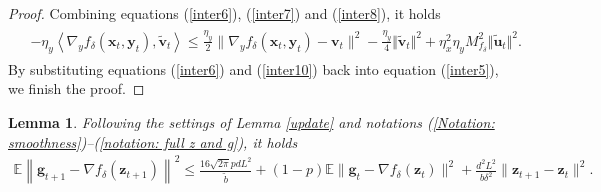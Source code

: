 \documentclass[11pt]{article}
\def\vg{\mathbf{g}}
\def\vu{\mathbf{u}}
\def\vv{\mathbf{v}}
\def\vx{\mathbf{x}}
\def\vz{\mathbf{z}}
\newtheorem{lemma}{Lemma}
\begin{document}
\begin{proof}
Combining equations (\ref{inter6}), (\ref{inter7}) and (\ref{inter8}), it holds
\begin{align}\label{inter10}
\begin{split}
&-\eta_y \left\langle \nabla_y f_{\delta}(  \vx_t, \mathbf{y}_t ),  \tilde{\vv}_t  \right\rangle\le
\frac{\eta_y}{2}\|\nabla_y f_{\delta}(  \vx_t, \mathbf{y}_t )- \mathbf{v}_t\|^2-
\frac{\eta_y}{4} \Vert \tilde{\vv}_t  \Vert^2 + \eta_x^2 \eta_y M_{f_\delta}^2 \Vert  \tilde{\vu}_t \Vert^2.
\end{split}
\end{align}
By substituting equations (\ref{inter6}) and (\ref{inter10}) back into equation (\ref{inter5}),  we finish the proof.
\end{proof} 


\begin{lemma}\label{lemma: C.4 SVRG accelerate}
Following the settings of Lemma \ref{update} and notations (\ref{Notation: smoothness})--(\ref{notation: full z and g}),  it holds
\begin{align}\label{ineq: variance reduction}
\!\!\mathbb{E} \left\| \vg_{t+1} - \nabla f_\delta(\vz_{t+1}) \right\|^2 
\leq \frac{ 16\sqrt{2\pi}pdL^2}{\tilde{b}} + (1-p) \mathbb{E} \| \vg_t - \nabla f_\delta(\vz_t) \|^2 +\frac{d^2L^2}{b\delta^2} \| \vz_{t+1}-\vz_t\|^2.
\end{align}
\end{lemma}
\end{document}
